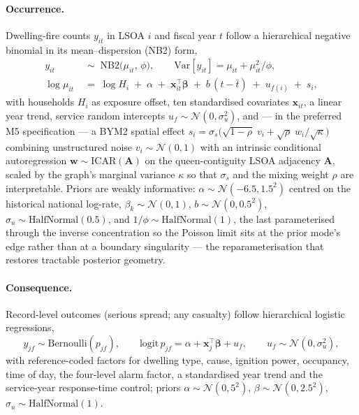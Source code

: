 \paragraph{Occurrence.} Dwelling-fire counts $y_{it}$ in LSOA $i$ and fiscal
year $t$ follow a hierarchical negative binomial in its mean--dispersion
(NB2) form,
\begin{align}
  y_{it} &\;\sim\; \mathrm{NB2}\big(\mu_{it},\, \phi\big),
  \qquad
  \mathrm{Var}[y_{it}] = \mu_{it} + \mu_{it}^2/\phi,
  \label{eq:nb2}\\
  \log \mu_{it} &\;=\; \log H_i \;+\; \alpha
  \;+\; \mathbf{x}_{it}^{\top}\boldsymbol\beta
  \;+\; b\,(t - \bar t)
  \;+\; u_{f(i)} \;+\; s_i ,
  \label{eq:occ-linpred}
\end{align}
with households $H_i$ as exposure offset, ten standardised covariates
$\mathbf{x}_{it}$, a linear year trend, service random intercepts
$u_f \sim \mathcal{N}(0, \sigma_u^2)$, and --- in the preferred M5
specification --- a BYM2 spatial effect
$s_i = \sigma_s\big(\sqrt{1-\rho}\; v_i + \sqrt{\rho}\; w_i/\sqrt{\kappa}\big)$
combining unstructured noise $v_i \sim \mathcal{N}(0,1)$ with an intrinsic
conditional autoregression $\mathbf{w} \sim \mathrm{ICAR}(\mathbf{A})$ on the
queen-contiguity LSOA adjacency $\mathbf{A}$, scaled by the graph's marginal
variance $\kappa$ so that $\sigma_s$ and the mixing weight $\rho$ are
interpretable. Priors are weakly informative:
$\alpha \sim \mathcal{N}(-6.5, 1.5^2)$ centred on the historical national
log-rate, $\beta_k \sim \mathcal{N}(0,1)$,
$b \sim \mathcal{N}(0, 0.5^2)$, $\sigma_u \sim \mathrm{HalfNormal}(0.5)$,
and $1/\phi \sim \mathrm{HalfNormal}(1)$, the last parameterised through the
inverse concentration so the Poisson limit sits at the prior mode's edge rather
than at a boundary singularity --- the reparameterisation that restores
tractable posterior geometry.

\paragraph{Consequence.} Record-level outcomes (serious spread; any casualty)
follow hierarchical logistic regressions,
\begin{equation}
  y_{jf} \sim \mathrm{Bernoulli}(p_{jf}), \qquad
  \mathrm{logit}\, p_{jf} = \alpha + \mathbf{x}_j^{\top}\boldsymbol\beta
  + u_f, \qquad u_f \sim \mathcal{N}(0, \sigma_u^2),
  \label{eq:cons-logit}
\end{equation}
with reference-coded factors for dwelling type, cause, ignition power,
occupancy, time of day, the four-level alarm factor, a standardised year trend
and the service-year response-time control; priors
$\alpha \sim \mathcal{N}(0, 5^2)$, $\beta \sim \mathcal{N}(0, 2.5^2)$,
$\sigma_u \sim \mathrm{HalfNormal}(1)$.

